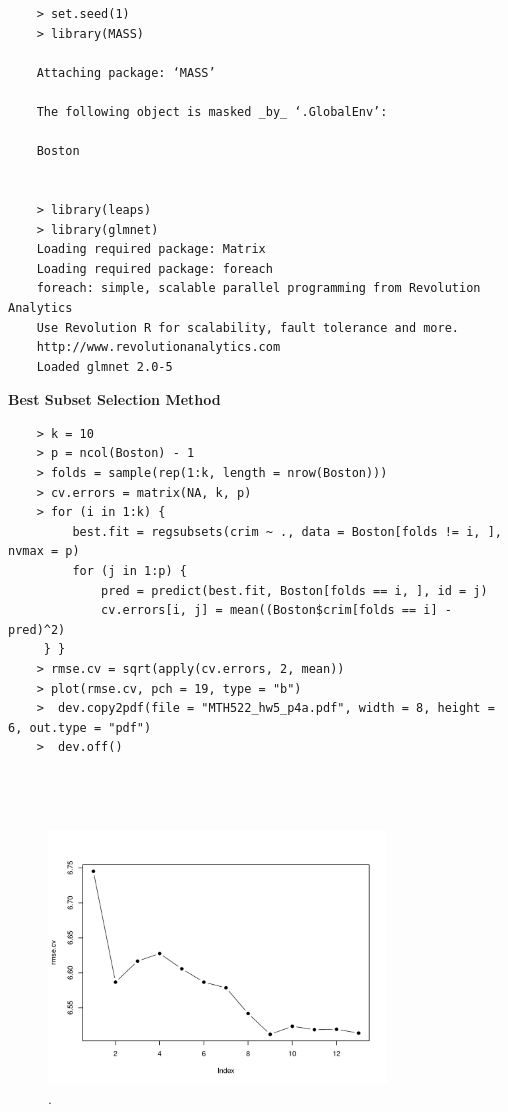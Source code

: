 \documentclass{article}
\begin{document}
\begin{program}
	\begin{verbatim}
	> set.seed(1)
	> library(MASS)
	
	Attaching package: ‘MASS’
	
	The following object is masked _by_ ‘.GlobalEnv’:
	
	Boston
	
	
	> library(leaps)
	> library(glmnet)
	Loading required package: Matrix
	Loading required package: foreach
	foreach: simple, scalable parallel programming from Revolution Analytics
	Use Revolution R for scalability, fault tolerance and more.
	http://www.revolutionanalytics.com
	Loaded glmnet 2.0-5
	\end{verbatim}
\end{program}


{\bf Best Subset Selection Method}


\begin{program}
	\begin{verbatim}
	> k = 10
	> p = ncol(Boston) - 1
	> folds = sample(rep(1:k, length = nrow(Boston)))
	> cv.errors = matrix(NA, k, p)
	> for (i in 1:k) {
	     best.fit = regsubsets(crim ~ ., data = Boston[folds != i, ], nvmax = p)
	     for (j in 1:p) {
	         pred = predict(best.fit, Boston[folds == i, ], id = j)
	         cv.errors[i, j] = mean((Boston$crim[folds == i] - pred)^2)
	 } }
	> rmse.cv = sqrt(apply(cv.errors, 2, mean))
	> plot(rmse.cv, pch = 19, type = "b")
	>  dev.copy2pdf(file = "MTH522_hw5_p4a.pdf", width = 8, height = 6, out.type = "pdf")
	>  dev.off()
	
	
	
	\end{verbatim}
\end{program}

\begin{figure}[htb]
	\begin{center}
		\includegraphics[width=0.8\textwidth]{MTH522_hw5_p4a.pdf}
	\end{center}
	\caption{.}
	\label{fig:MTH522_hw5_p4a}
\end{figure}
\end{document}
